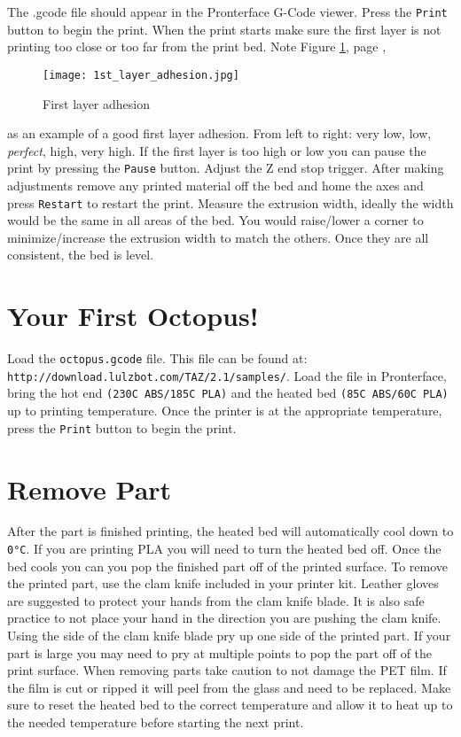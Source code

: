 The .gcode file should appear in the Pronterface G-Code viewer. Press the \texttt{Print} button to begin the print. When the print starts make sure the first layer is not printing too close or too far from the print bed. Note 
Figure \ref{fig:1st_layer_adhesion}, page \pageref{fig:1st_layer_adhesion},
\begin{figure}[hbt]
\centering
\texttt{[image: 1st\_layer\_adhesion.jpg]}
\caption{First layer adhesion}
\label{fig:1st_layer_adhesion}
\end{figure}
as an example of a good first layer adhesion. From left to right: very low, low, \emph{perfect}, high, very high. If the first layer is too high or low you can pause the print by pressing the \texttt{Pause} button. Adjust the Z end stop trigger. After making adjustments remove any printed material off the bed and home the axes and press \texttt{Restart} to restart the print. Measure the extrusion width, ideally the width would be the same in all areas of the bed. You would raise/lower a corner to minimize/increase the extrusion width to match the others. Once they are all consistent, the bed is level.

\section{Your First Octopus!}
Load the \texttt{octopus.gcode} file. This file can be found at:
\texttt{http://download.lulzbot.com/TAZ/2.1/samples/}. Load the file in Pronterface, bring the hot end \texttt{(230C ABS/185C PLA)} and the heated bed \texttt{(85C ABS/60C PLA)} up to printing temperature. Once the printer is at the appropriate temperature, press the \texttt{Print} button to begin the print.

\section{Remove Part}
After the part is finished printing, the heated bed will automatically cool down to \texttt{0°C}. If you are printing PLA you will need to turn the heated bed off. Once the bed cools you can you pop the finished part off of the printed surface. To remove the printed part, use the clam knife included in your printer kit. Leather gloves are suggested to protect your hands from the clam knife blade. It is also safe practice to not place your hand in the direction you are pushing the clam knife. Using the side of the clam knife blade pry up one side of the printed part. If your part is large you may need to pry at multiple points to pop the part off of the print surface. When removing parts take caution to not damage the PET film. If the film is cut or ripped it will peel from the glass and need to be replaced. Make sure to reset the heated bed to the correct temperature and allow it to heat up to the needed temperature before starting the next print.

